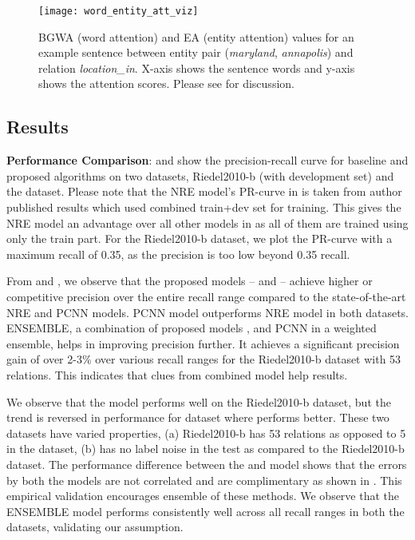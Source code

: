 \documentclass{article}
\begin{document}
\begin{figure}[t]
\centering
  \setlength{\textfloatsep}{0.30cm}
  \texttt{[image: word\_entity\_att\_viz]}
  \caption{\label{fig:attviz}BGWA (word attention) and EA (entity attention) values for an example sentence between entity pair (\textit{maryland},  \textit{annapolis}) and relation \textit{location\_in}. X-axis shows the sentence words and y-axis shows the attention scores. Please see  for discussion.}
\end{figure}


\subsection{Results}
\label{sec:exp_results}

\textbf{Performance Comparison}:  and  show the precision-recall curve for baseline and proposed algorithms on two datasets, Riedel2010-b (with development set) 
and the \newdatasetshort{} dataset. Please note that the NRE model's PR-curve in  is taken from author published results which used  combined train+dev set for training. This gives the NRE model an advantage over all other models in  as all of them are trained using only the train part. For the Riedel2010-b dataset, we plot the PR-curve with a maximum recall of 0.35, as the precision is too low beyond 0.35 recall.

From  and , we observe that the proposed models -- \systemwa{} and \systemea{} --  achieve higher or competitive precision over the entire recall range compared to the state-of-the-art NRE and PCNN models. PCNN model outperforms NRE model in both datasets. ENSEMBLE, a combination of proposed models \systemwa{}, \systemea{} and PCNN in a weighted ensemble, helps in improving precision further. It achieves a significant precision gain of over 2-3\% over various recall ranges for the Riedel2010-b dataset with 53 relations. This indicates that clues from combined model help results.

We observe that the \systemwa{} model performs well on the Riedel2010-b dataset, but the trend is reversed in performance for \newdatasetshort{} dataset where \systemea{} performs better. These two datasets have varied properties, (a) Riedel2010-b has 53 relations as opposed to 5 in the \newdatasetshort{} dataset, (b) \newdatasetshort{} has no label noise in the test as compared to the Riedel2010-b dataset. The performance difference between the \systemwa{} and \systemea{} model shows that the errors by both the models are not correlated and are complimentary as shown in . This empirical validation encourages ensemble of these methods. We observe that the ENSEMBLE model performs consistently well across all recall ranges in both the datasets, validating our assumption. 
\end{document}
